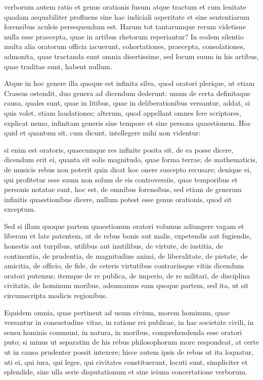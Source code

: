  verborum autem ratio et genus orationis fusum atque tractum et cum lenitate quadam aequabiliter profluens sine hac iudiciali asperitate et sine sententiarum forensibus aculeis persequendum est. Harum tot tantarumque rerum videtisne nulla esse praecepta, quae in artibus rhetorum reperiantur? In eodem silentio multa alia oratorum officia iacuerunt, cohortationes, praecepta, consolationes, admonita, quae tractanda sunt omnia disertissime, sed locum suum in his artibus, quae traditae sunt, habent nullum.

 Atque in hoc genere illa quoque est infinita silva, quod oratori plerique, ut etiam Crassus ostendit, duo genera ad dicendum dederunt: unum de certa definitaque causa, quales sunt, quae in litibus, quae in deliberationibus versantur, addat, si quis volet, etiam laudationes; alterum, quod appellant omnes fere scriptores, explicat nemo, infinitam generis sine tempore et sine persona quaestionem. Hoc quid et quantum sit, cum dicunt, intellegere mihi non videntur:

 si enim est oratoris, quaecumque res infinite posita sit, de ea posse dicere, dicendum erit ei, quanta sit solis magnitudo, quae forma terrae; de mathematicis, de musicis rebus non poterit quin dicat hoc onere suscepto recusare; denique ei, qui profitetur esse suum non solum de eis controversiis, quae temporibus et personis notatae sunt, hoc est, de omnibus forensibus, sed etiam de generum infinitis quaestionibus dicere, nullum potest esse genus orationis, quod sit exceptum.

 Sed si illam quoque partem quaestionum oratori volumus adiungere vagam et liberam et late patentem, ut de rebus bonis aut malis, expetendis aut fugiendis, honestis aut turpibus, utilibus aut inutilibus, de virtute, de iustitia, de continentia, de prudentia, de magnitudine animi, de liberalitate, de pietate, de amicitia, de officio, de fide, de ceteris virtutibus contrariisque vitiis dicendum oratori putemus; itemque de re publica, de imperio, de re militari, de disciplina civitatis, de hominum moribus, adsumamus eam quoque partem, sed ita, ut sit circumscripta modicis regionibus.

 Equidem omnia, quae pertinent ad usum civium, morem hominum, quae versantur in consuetudine vitae, in ratione rei publicae, in hac societate civili, in sensu hominis communi, in natura, in moribus, comprehendenda esse oratori puto; si minus ut separatim de his rebus philosophorum more respondeat, at certe ut in causa prudenter possit intexere; hisce autem ipsis de rebus ut ita loquatur, uti ei, qui iura, qui leges, qui civitates constituerunt, locuti sunt, simpliciter et splendide, sine ulla serie disputationum et sine ieiuna concertatione verborum.

